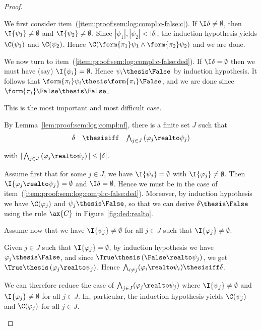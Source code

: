 \begin{proof}
\begin{description}
We first consider item~(\ref{item:proof:sem:log:compl:c-false:c}).
If $\I\delta \neq \emptyset$,
then $\I{\psi_1} \neq \emptyset$
and $\I{\psi_2} \neq \emptyset$.
Since $|\psi_1|, |\psi_2| < |\delta|$,
the induction hypothesis yields
$\C(\psi_1)$ and $\C(\psi_2)$.
Hence
$\C(\form{\pi_1}\psi_1 \land \form{\pi_2}\psi_2)$
and we are done.

We now turn to item~(\ref{item:proof:sem:log:compl:c-false:ded}).
If $\I\delta = \emptyset$ then we must have (say)
$\I{\psi_i} = \emptyset$.
Hence $\psi_i \thesis \False$ by induction hypothesis.
It follows that
$\form{\pi_i}\psi_i \thesis \form{\pi_i}\False$,
and we are done since
$\form{\pi_i}\False \thesis \False$.

\item[Case of $\PTbis \arrow \PT$.]
This is the most important and most difficult case.

By Lemma~\ref{lem:proof:sem:log:compl:nf},
there is a finite set $J$ such that
\[
\begin{array}{l l l}
  \delta
& \thesisiff
& \bigwedge_{j \in J} \left(\varphi_j \realto \psi_j\right)
\end{array}
\]

\noindent
with
\(
  |\bigwedge_{j \in J} \left(\varphi_j \realto \psi_j\right)|
  \leq
  |\delta|
\).

Assume first that for some $j \in J$,
we have $\I{\psi_j} = \emptyset$
with $\I{\varphi_j} \neq \emptyset$.
Then $\I{\varphi_j \realto \psi_j} = \emptyset$
and $\I\delta = \emptyset$.
Hence we must be in the case of item~(\ref{item:proof:sem:log:compl:c-false:ded}).
Moreover, by induction hypothesis we have $\C(\varphi_j)$
and $\psi_j \thesis \False$,
so that we can derive $\delta \thesis \False$ using the rule $\ax{C}$
in Figure~\ref{fig:ded:realto}.


Assume now that we have $\I{\psi_j} \neq \emptyset$
for all $j \in J$ such that $\I{\varphi_j} \neq \emptyset$.

Given $j \in J$ such that $\I{\varphi_j} = \emptyset$,
by induction hypothesis we have $\varphi_j \thesis \False$,
and since $\True \thesis \left( \False \realto \psi_j \right)$,
we get $\True \thesis \left(\varphi_j \realto \psi_j \right)$.
Hence
$\bigwedge_{i \neq j}(\varphi_i \realto \psi_i) \thesisiff \delta$.

We can therefore reduce the case of 
$\bigwedge_{j \in J} (\varphi_j \realto \psi_j)$
where 
$\I{\psi_j} \neq \emptyset$ and $\I{\varphi_j} \neq \emptyset$
for all $j \in J$.
In, particular, the induction hypothesis yields $\C(\psi_j)$
and $\C(\varphi_j)$ for all $j \in J$.



\end{description}
\end{proof}
